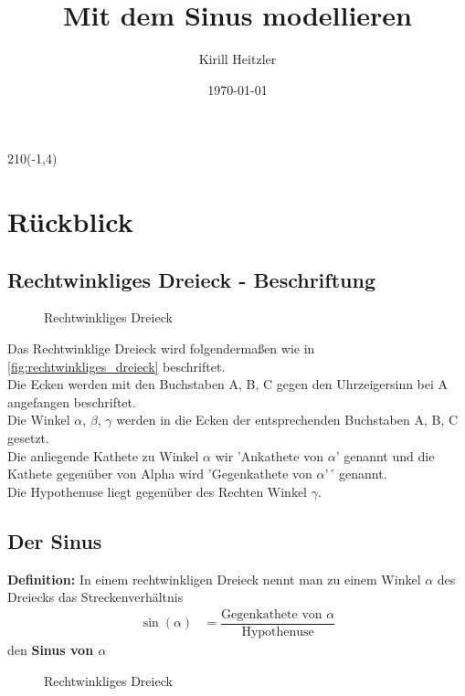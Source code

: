 \documentclass[12pt,a4paper]{article}
\title{Mit dem Sinus modellieren}
\author{Kirill Heitzler}
\date{\today}
\begin{document}
\maketitle
\begin{textblock}{210}(-1,4)
	\begin{figure}[h!] 
	\end{figure}
\end{textblock}
\newpage

\tableofcontents

\newpage

\section{Rückblick}

\subsection{Rechtwinkliges Dreieck - Beschriftung} 
\begin{figure}[hb!]
    \centering
    \def\svgwidth{200px}
    
    \caption{Rechtwinkliges Dreieck}
  	\label{fig:rechtwinkliges_dreieck}
\end{figure}
\noindent
Das Rechtwinklige Dreieck wird folgendermaßen wie in \autoref{fig:rechtwinkliges_dreieck} beschriftet. \\
Die Ecken werden mit den Buchstaben A, B, C gegen den Uhrzeigersinn bei A angefangen beschriftet. \\
Die Winkel $\alpha$, $\beta$, $\gamma$ werden in die Ecken der entsprechenden Buchstaben A, B, C gesetzt. \\
Die anliegende Kathete zu Winkel $\alpha$ wir 'Ankathete von $\alpha$' genannt und die Kathete gegenüber von Alpha wird 'Gegenkathete von $\alpha$'´ genannt. \\
Die Hypothenuse liegt gegenüber des Rechten Winkel $\gamma$.

\subsection{Der Sinus}
\textbf{Definition:} In einem rechtwinkligen Dreieck nennt man zu einem Winkel $\alpha$ des Dreiecks das Streckenverhältnis  
\begin{align}
 \sin(\alpha) &= \dfrac{\text{Gegenkathete von $\alpha$}}{\text{Hypothenuse}}
\end{align}
den \textbf{Sinus von $\alpha$}
\begin{figure}[hb!]
    \centering
    \def\svgwidth{200px}
    
    \caption{Rechtwinkliges Dreieck}
  	\label{fig:rechtwinkliges_dreieck}
\end{figure}
\newpage
\end{document}

